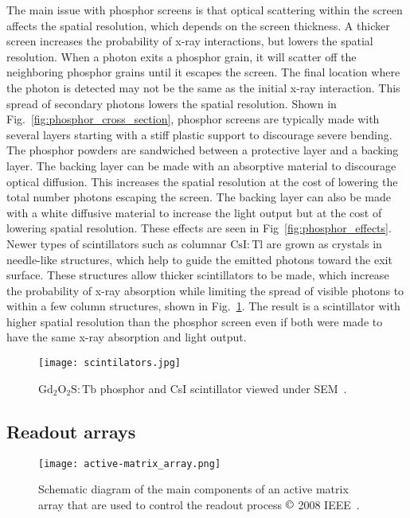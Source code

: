 The main issue with phosphor screens is that optical scattering within the screen affects the spatial resolution, which depends on the screen thickness.  A thicker screen increases the probability of x-ray interactions, but lowers the spatial resolution.  When a photon exits a phosphor grain, it will scatter off the neighboring phosphor grains until it escapes the screen.  The final location where the photon is detected may not be the same as the initial x-ray interaction.  This spread of secondary photons lowers the spatial resolution.  Shown in Fig.~\ref{fig:phosphor_cross_section}, phosphor screens are typically made with several layers starting with a stiff plastic support to discourage severe bending.  The phosphor powders are sandwiched between a protective layer and a backing layer.  The backing layer can be made with an absorptive material to discourage optical diffusion.  This increases the spatial resolution at the cost of lowering the total number photons escaping the screen.  The backing layer can also be made with a white diffusive material to increase the light output but at the cost of lowering spatial resolution.  These effects are seen in Fig~\ref{fig:phosphor_effects}.  Newer types of scintillators such as columnar $\mathrm{CsI:Tl}$ are grown as crystals in needle-like structures, which help to guide the emitted photons toward the exit surface.  These structures allow thicker scintillators to be made, which increase the probability of x-ray absorption while limiting the spread of visible photons to within a few column structures, shown in Fig.~\ref{fig:scintillators}.  The result is a scintillator with higher spatial resolution than the phosphor screen even if both were made to have the same x-ray absorption and light output.


\begin{figure}[ht]
\texttt{[image: scintilators.jpg]}
\caption{$\mathrm{Gd_2O_2S:Tb}$ phosphor and CsI scintillator viewed under SEM~\citep{scintillatorImage}.}
\label{fig:scintillators}
\end{figure}

\subsection{Readout arrays}

\begin{figure}[ht]
\texttt{[image: active-matrix\_array.png]}
\caption[Schematic diagram of the main components of an active matrix array that are used to control the readout process.]{Schematic diagram of the main components of an active matrix array that are used to control the readout process $\copyright$ 2008 IEEE~\citep{Fahrig2008}.}
\label{fig:schematic_active-matrix_array}
\end{figure}

